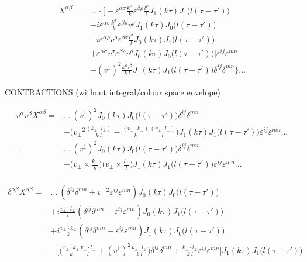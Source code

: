 \begin{equation*}
\begin{split}
 X^{\alpha \beta} = & ...~ \bigg\{ \bigg[ -\varepsilon^{\alpha \sigma} \frac{k^\sigma}{k} \varepsilon^{\beta \rho} \frac{l^\rho}{l} J_1 (k \tau) J_1\big(l(\tau-\tau')\big) \\
& -i \varepsilon^{\alpha \sigma} \frac{k^\sigma}{k} \varepsilon^{\beta \rho} v^\rho J_1 (k \tau) J_0\big(l(\tau-\tau')\big) \\
& -i \varepsilon^{\alpha \rho} v^\rho \varepsilon^{\beta \sigma} \frac{l^\sigma}{l} J_0 (k \tau) J_1\big(l(\tau-\tau')\big) \\
& + \varepsilon^{\alpha \sigma} v^\sigma \varepsilon^{\beta \rho} v^\rho J_0 (k \tau) J_0\big(l(\tau-\tau')\big) \bigg] \varepsilon^{ij} \varepsilon^{mn} \\ 
& -(v^1)^2 \frac{k^\alpha l^\beta}{k ~l} J_1 (k \tau) J_1\big(l(\tau-\tau')\big) \delta^{ij} \delta^{mn} \bigg\} ...
\end{split}
\end{equation*}

\newpage

CONTRACTIONS (without integral/colour space envelope)

\begin{equation*}
\begin{split}
v^\alpha v^\beta X^{\alpha \beta} = & ...~ (v^1)^2 J_0 (k \tau) J_0\big(l(\tau-\tau')\big) \delta^{ij} \delta^{mn} \\
& - \Big( {v_\perp}^2 \frac{(k_\perp \cdot l_\perp)}{k ~l} - \frac{(v_\perp \cdot k_\perp)}{k}\frac{(v_\perp \cdot l_\perp)}{l}\Big) J_1 (k \tau) J_1\big(l(\tau-\tau')\big) \varepsilon^{ij} \varepsilon^{mn} ... \\
= & ... ~(v^1)^2 J_0 (k \tau) J_0\big(l(\tau-\tau')\big) \delta^{ij} \delta^{mn} \\
& - \Big(v_\perp \times \frac{k_\perp}{k} \Big) \Big(v_\perp \times \frac{l_\perp}{l} \Big)J_1 (k \tau) J_1\big(l(\tau-\tau')\big) \varepsilon^{ij} \varepsilon^{mn} ... \\
\end{split}
\end{equation*}

\begin{equation*}
\begin{split}
\delta^{\alpha \beta} X^{\alpha \beta}=& ...~ (\delta^{ij} \delta^{mn} + {v_\perp}^2 \varepsilon^{ij} \varepsilon^{mn}) J_0 (k \tau) J_0\big(l(\tau-\tau')\big) \\
& + i \frac{v_\perp \cdot l_\perp}{l} (\delta^{ij} \delta^{mn} - \varepsilon^{ij} \varepsilon^{mn}) J_0 (k \tau) J_1\big(l(\tau-\tau')\big) \\
& + i \frac{v_\perp \cdot k_\perp}{k} (\delta^{ij} \delta^{mn} - \varepsilon^{ij} \varepsilon^{mn}) J_1 (k \tau) J_0\big(l(\tau-\tau')\big) \\
& - \bigg[ \Big(\frac{v_\perp \cdot k_\perp}{k} \frac{v_\perp \cdot l_\perp}{l} + (v^1)^2 \frac{k_\perp \cdot l_\perp}{k~l} \Big) \delta^{ij} \delta^{mn} + \frac{k_\perp \cdot l_\perp}{k ~l} \varepsilon^{ij}\varepsilon^{mn} \bigg] J_1 (k \tau) J_1\big(l(\tau-\tau')\big) \end{split}
\end{equation*}

